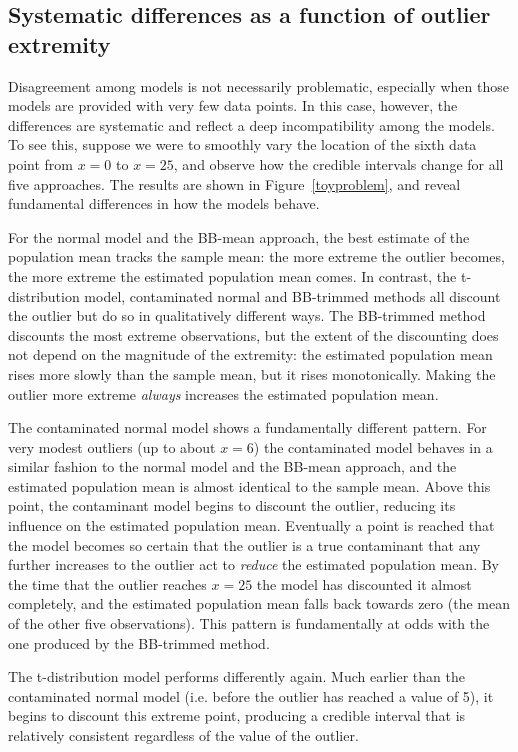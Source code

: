 \documentclass[doc]{apa6}
\begin{document}
{\subsection{Systematic differences as a function of outlier extremity}

Disagreement among models is not necessarily problematic, especially when those models are provided with very few data points. In this case, however, the differences are systematic and reflect a deep incompatibility among the models. To see this, suppose we were to smoothly vary the location of the sixth data point from $x=0$ to $x=25$, and observe how the credible intervals change for all     five   approaches. The results are shown in Figure~\ref{toyproblem}, and reveal fundamental differences in how the models behave.

For the normal model and the BB-mean approach, the best estimate of the population mean tracks the sample mean: the more extreme the outlier becomes, the more extreme the estimated population mean comes. In contrast,   the t-distribution model,   contaminated normal and BB-trimmed methods       all discount the outlier but  do so in qualitatively different ways. The BB-trimmed method discounts the most extreme observations, but the extent of the discounting does not depend on the magnitude of the extremity: the estimated population mean rises more slowly than the sample mean, but it rises monotonically. Making the outlier more extreme {\it always} increases the estimated population mean.

The contaminated normal model shows a fundamentally different pattern. For very modest outliers (up to about $x=6$) the contaminated model behaves in a similar fashion to the normal model and the BB-mean approach, and the estimated population mean is almost identical to the sample mean. Above this point, the contaminant model begins to discount the outlier, reducing its influence on the estimated population mean. Eventually a point is reached that the model becomes so certain that the outlier is a true contaminant that any further increases to the outlier act to {\it reduce} the estimated population mean. By the time that the outlier reaches $x=25$ the model has discounted it almost completely, and the estimated population mean falls back towards zero (the mean of the other five observations). This pattern is fundamentally at odds with the one produced by the BB-trimmed method.

The t-distribution model performs differently again.  Much earlier than the contaminated normal model (i.e. before the outlier has reached a value of 5), it begins to  discount this extreme point, producing a credible interval that is relatively consistent regardless of the value of the outlier.


}
\end{document}
